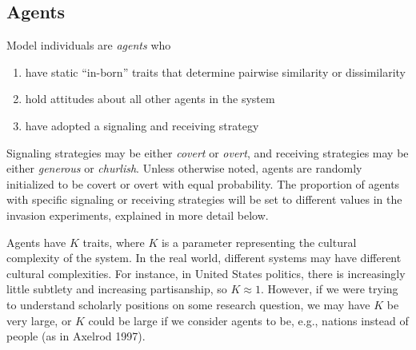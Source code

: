 \documentclass[11pt,letterpaper]{article}
\begin{document}
\subsection{Agents}

Model individuals are \emph{agents} who 
\begin{enumerate}
  \item have static ``in-born'' traits that determine pairwise similarity or dissimilarity
  \item hold attitudes about all other agents in the system
  \item have adopted a signaling and receiving strategy
\end{enumerate}
Signaling strategies
may be either \emph{covert} or \emph{overt}, and receiving strategies may be
either \emph{generous} or \emph{churlish}. Unless otherwise noted, agents are
randomly initialized to be covert or overt with equal probability. The 
proportion of agents with specific signaling or receiving strategies will be
set to different values in the invasion experiments, explained in more detail below.

Agents have $K$ traits, where $K$ is a parameter representing the cultural 
complexity of the system. In the real world, different systems may have 
different cultural complexities. For instance, in United States politics, there
is increasingly little subtlety and increasing partisanship, so $K \approx1 $.
However, if we were trying to understand scholarly positions on some research
question, we may have $K$ be very large, or $K$ could be large if we consider
agents to be, e.g., nations instead of people (as in Axelrod 1997).  
\end{document}
